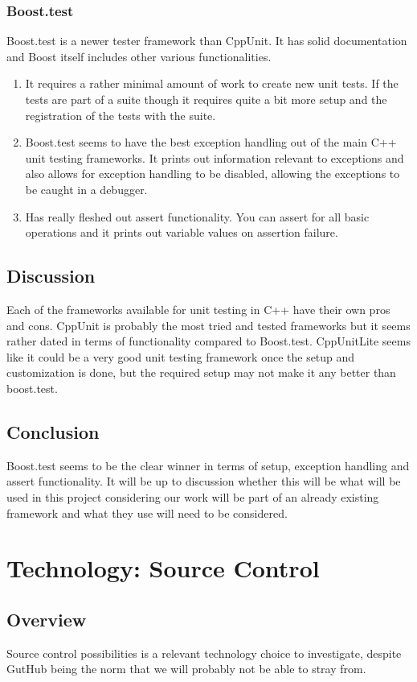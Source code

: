 \documentclass[onecolumn, draftclsnofoot,10pt, compsoc]{IEEEtran}
\begin{document}
\subsubsection{Boost.test}
Boost.test is a newer tester framework than CppUnit. It has solid documentation and Boost itself includes other various functionalities.
\begin{enumerate}
\item It requires a rather minimal amount of work to create new unit tests. If the tests are part of a suite though it requires quite a bit more setup and the registration of the tests with the suite.
\item Boost.test seems to have the best exception handling out of the main C++ unit testing frameworks. It prints out information relevant to exceptions and also allows for exception handling to be disabled, allowing the exceptions to be caught in a debugger.
\item Has really fleshed out assert functionality. You can assert for all basic operations and it prints out variable values on assertion failure.
\end{enumerate}

\subsection{Discussion}
Each of the frameworks available for unit testing in C++ have their own pros and cons. CppUnit is probably the most tried and tested frameworks but it seems rather dated in terms of functionality compared to Boost.test. CppUnitLite seems like it could be a very good unit testing framework once the setup and customization is done, but the required setup may not make it any better than boost.test.

\subsection{Conclusion}
Boost.test seems to be the clear winner in terms of setup, exception handling and assert functionality. It will be up to discussion whether this will be what will be used in this project considering our work will be part of an already existing framework and what they use will need to be considered.

\section{Technology: Source Control}

\subsection{Overview}
Source control possibilities is a relevant technology choice to investigate, despite GutHub being the norm that we will probably not be able to stray from. 
\end{document}
